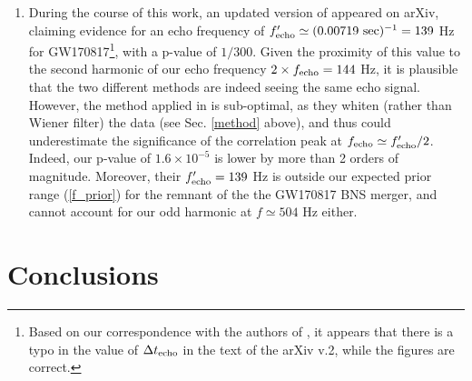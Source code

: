\documentclass[a4paper,11pt]{article}
\begin{document}
\begin{enumerate}

\item During the course of this work, an updated version of \cite{Conklin:2017lwb} appeared on arXiv, claiming evidence for an echo frequency of $f'_{\rm echo} \simeq (0.00719 ~{\rm sec}) ^{-1}= 139$ Hz for GW170817\footnote{Based on our correspondence with the authors of \cite{Conklin:2017lwb}, it appears that there is a typo in the value of $\Delta t_{\rm echo}$ in the text of the arXiv v.2, while the figures are correct.}, with a p-value of $1/300$. Given the proximity of this value to the second harmonic of our echo frequency $2\times f_{\rm echo} = 144$ Hz, it is plausible that the two different methods are indeed seeing the same echo signal. However, the method applied in  \cite{Conklin:2017lwb} is sub-optimal, as they whiten (rather than Wiener filter) the data (see Sec. \ref{method} above), and thus could underestimate the significance of the correlation peak at $f_{\rm echo} \simeq f'_{\rm echo}/2$. Indeed, our p-value of  $1.6 \times 10^{-5}$ is lower by more than 2 orders of magnitude. Moreover, their $f'_{\rm echo} = 139$ Hz is outside our expected prior range (\ref{f_prior}) for the remnant of the the GW170817 BNS merger, and cannot account for our odd harmonic at $f \simeq 504$ Hz either.  

\end{enumerate}
\section{\label{conclude}Conclusions}
\end{document}
